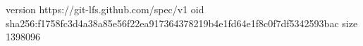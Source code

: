version https://git-lfs.github.com/spec/v1
oid sha256:f1758fc3d4a38a85e56f22ea917364378219b4e1fd64e1f8c0f7df5342593bac
size 1398096
